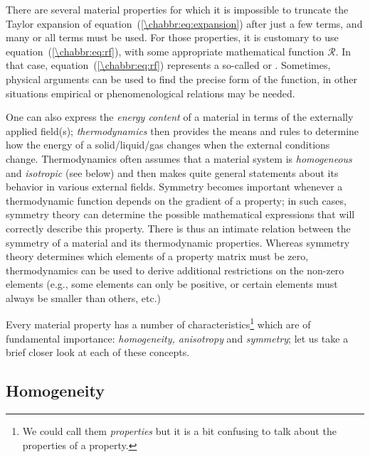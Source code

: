 There are several material properties for which it is impossible to truncate the Taylor expansion of equation~(\ref{\chabbr:eq:expansion}) after just a few terms, and many or all terms must be used. For those properties, it is customary to use equation~(\ref{\chabbr:eq:rf}), with some appropriate mathematical function $\mathcal{R}$. In that case, equation~(\ref{\chabbr:eq:rf}) represents a so-called  or .  Sometimes, physical arguments can be used to find the precise form of the function, in other situations empirical or phenomenological relations may be needed.

One can also express the \textit{energy content} of a material in terms of the externally applied field(s); \textit{thermodynamics} then provides the means and rules to determine how the energy of a solid/liquid/gas changes when the external conditions change.  Thermodynamics often assumes that a material system is \textit{homogeneous} and \textit{isotropic} (see below) and then makes quite general statements about its behavior in various external fields.  Symmetry becomes important whenever a thermodynamic function depends on the gradient of a property; in such cases, symmetry theory can determine the possible mathematical expressions that will correctly describe this property.  There is thus an intimate relation between the symmetry of a material and its thermodynamic properties.  Whereas symmetry theory determines which elements of a property matrix must be zero, thermodynamics can be used to derive additional restrictions on the non-zero elements (e.g., some elements can only be positive, or certain elements must always be smaller than others, etc.)  

Every material property has a number of characteristics\footnote{We could call them \textit{properties} but it is a bit confusing to talk about the properties of a property.} which are of fundamental importance: \textit{homogeneity, anisotropy} and \textit{symmetry}; let us take a brief closer look at each of these concepts.

\subsection{Homogeneity}
\label{\chabbr:ssec:homogeneity}


